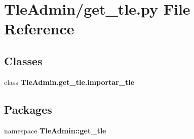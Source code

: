 \section{\-Tle\-Admin/get\-\_\-tle.py \-File \-Reference}
\label{get__tle_8py}
\subsection*{\-Classes}
\begin{DoxyCompactItemize}
\item 
class {\bf \-Tle\-Admin.\-get\-\_\-tle.\-importar\-\_\-tle}
\end{DoxyCompactItemize}
\subsection*{\-Packages}
\begin{DoxyCompactItemize}
\item 
namespace {\bf \-Tle\-Admin\-::get\-\_\-tle}
\end{DoxyCompactItemize}
